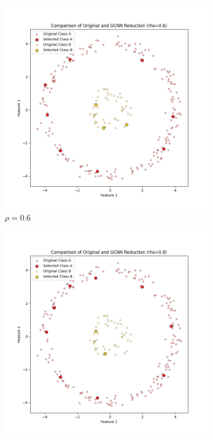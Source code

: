 \begin{figure}[ht]
	\centering
	\begin{subfigure}[b]{0.3\textwidth}
		\centering
		\includegraphics[width=\textwidth]{figures/gcnn/comparison_plot_rho_0.6.png}
		\caption{$\rho = 0.6$}
		\label{fig:rho0.6}
	\end{subfigure}
	\hfill
	\begin{subfigure}[b]{0.3\textwidth}
		\centering
		\includegraphics[width=\textwidth]{figures/gcnn/comparison_plot_rho_0.8.png}

\end{subfigure}
\end{figure}
